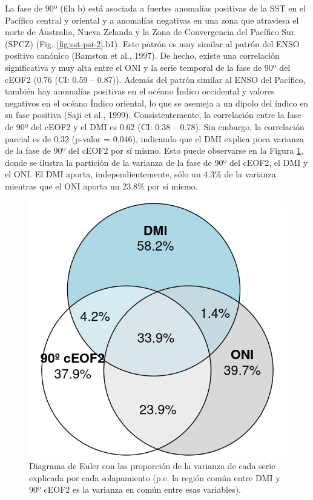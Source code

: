 \documentclass[12pt,oneside]{reedthesis}
\begin{document}
La fase de 90º (fila b) está asociada a fuertes anomalías positivas de la SST en el Pacífico central y oriental y a anomalías negativas en una zona que atraviesa el norte de Australia, Nueva Zelanda y la Zona de Convergencia del Pacífico Sur (SPCZ) (Fig. \ref{fig:sst-psi-2}.b1).
Este patrón es muy similar al patrón del ENSO positivo canónico (Bamston et al., 1997).
De hecho, existe una correlación significativa y muy alta entre el ONI y la serie temporal de la fase de 90º del cEOF2 (0.76 (CI: 0.59 -- 0.87)).
Además del patrón similar al ENSO del Pacífico, también hay anomalías positivas en el océano Índico occidental y valores negativos en el océano Índico oriental, lo que se asemeja a un dipolo del índico en su fase positiva (Saji et al., 1999).
Consistentemente, la correlación entre la fase de 90º del cEOF2 y el DMI es 0.62 (CI: 0.38 -- 0.78).
Sin embargo, la correlación parcial es de 0.32 (p-valor = 0.046), indicando que el DMI explica poca varianza de la fase de 90º del cEOF2 por sí mismo.
Esto puede observarse en la Figura \ref{fig:euler}, donde se ilustra la partición de la varianza de la fase de 90º del cEOF2, el DMI y el ONI.
El DMI aporta, independientemente, sólo un 4.3\% de la varianza mientras que el ONI aporta un 23.8\% por sí mismo.



\begin{figure}
\includegraphics{figures/20-ceofs/euler-1} \caption{Diagrama de Euler con las proporción de la varianza de cada serie explicada por cada solapamiento (p.e. la región común entre DMI y 90º cEOF2 es la varianza en común entre esas variables).}\label{fig:euler}
\end{figure}
\end{document}
